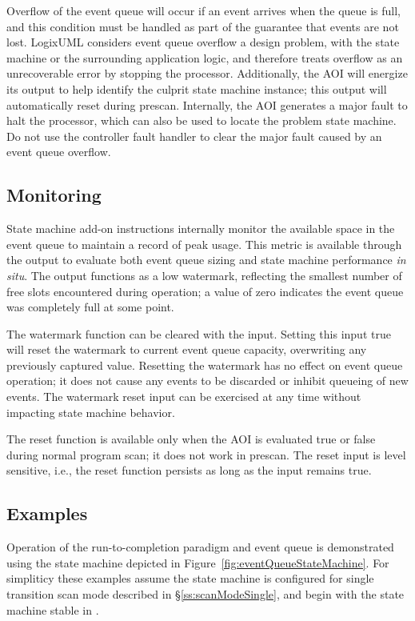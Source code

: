 Overflow of the event queue will occur if an event arrives when the queue
is full, and this condition must be handled as part of the guarantee that
events are not lost.
LogixUML considers event queue overflow a design problem,
with the state machine or the surrounding application logic, and
therefore treats overflow as an unrecoverable error by stopping the processor.
Additionally, the AOI will energize its 
output to help identify the culprit state machine instance; this output
will automatically reset during prescan. Internally, the AOI generates
a major fault to halt the processor, which can also be used to locate the
problem state machine. Do not use the controller fault handler
to clear the major fault caused by an event queue overflow.


\subsection{Monitoring}

State machine add-on instructions internally monitor the available space in
the event queue to maintain a record of peak usage. This metric is
available through the  output
to evaluate both event queue sizing and state machine performance
\emph{in situ}. The output functions as a low
watermark, reflecting the smallest number of free slots encountered during
operation; a value of zero indicates the event queue was completely
full at some point.

The watermark function can be cleared with the
 input. Setting this input true will
reset the watermark to current event queue capacity, overwriting any
previously captured value. Resetting the watermark has no effect on event
queue operation; it does not cause any events to be discarded or inhibit
queueing of new events. The watermark reset input can be exercised at any
time without impacting state machine behavior.

The reset function is available only when the
AOI is evaluated true or false during normal program scan; it does not
work in prescan. The reset input is level sensitive, i.e., the reset
function persists as long as the input remains true.


\subsection{Examples}

Operation of the run-to-completion paradigm and event queue is
demonstrated using the state machine depicted in
Figure~\ref{fig:eventQueueStateMachine}. For simpliticy these examples
assume the state machine is configured for single transition scan mode
described in \S\ref{ss:scanModeSingle},
and begin with the state machine stable in .

